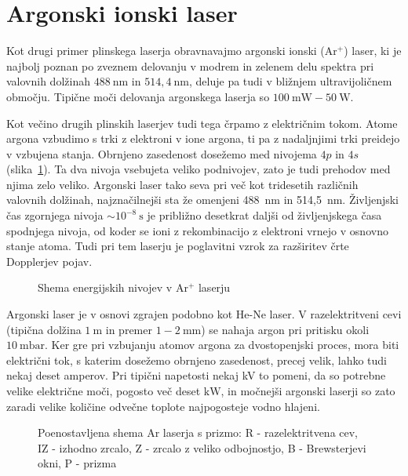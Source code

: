 \section{Argonski ionski laser}
Kot drugi primer plinskega laserja obravnavajmo argonski ionski (Ar$^+$) laser,
ki je najbolj poznan po zveznem delovanju v modrem in zelenem delu spektra pri 
valovnih dolžinah $488~\si{\nano\metre}$ in $514,4~\si{\nano\metre}$, deluje 
pa tudi v bližnjem ultravijoličnem območju. Tipične moči delovanja argonskega laserja
so $100~\si{\milli\watt} - 50~\si{\watt}$.

Kot večino drugih plinskih laserjev tudi tega črpamo z električnim tokom.
Atome argona vzbudimo s trki z elektroni v ione argona, ti pa z nadaljnjimi
trki preidejo v vzbujena stanja. Obrnjeno zasedenost
dosežemo med nivojema $4p$ in $4s$ (slika~\ref{fig:ArE}). 
Ta dva nivoja vsebujeta veliko podnivojev, zato je tudi prehodov med
njima zelo veliko. Argonski laser tako seva pri več kot tridesetih različnih
valovnih dolžinah, najznačilnejši sta že omenjeni 488~nm in 514,5~nm. 
Življenjski čas zgornjega nivoja $\sim 10^{-8}~\si{\second}$ je približno 
desetkrat daljši od življenjskega časa spodnjega nivoja, od koder se ioni
z rekombinacijo z elektroni vrnejo v osnovno stanje atoma. Tudi pri tem laserju
je poglavitni vzrok za razširitev črte Dopplerjev 
pojav.

\begin{figure}[h]
\centering
\def\svgwidth{80truemm} 

\caption{Shema energijskih nivojev v Ar$^+$ laserju}
\label{fig:ArE}
\end{figure}

Argonski laser je v osnovi zgrajen podobno kot He-Ne laser. 
V razelektritveni cevi
(tipična dolžina $1~\si{\metre}$ in premer $1-2~\si{\milli\metre}$)
se nahaja argon pri pritisku okoli $10~\si{\milli\bar}$. Ker gre pri 
vzbujanju atomov argona za dvostopenjski proces, mora biti električni tok, 
s katerim dosežemo obrnjeno zasedenost, precej velik, lahko tudi nekaj deset amperov. 
Pri tipični napetosti nekaj kV to pomeni, da so potrebne velike električne moči, 
pogosto več deset $\si{\kilo\watt}$, in močnejši argonski laserji so zato zaradi 
velike količine odvečne toplote najpogosteje vodno hlajeni.

\begin{figure}[h]
\centering
\def\svgwidth{110truemm} 

\caption{Poenostavljena shema Ar laserja s prizmo: R - razelektritvena cev, 
IZ - izhodno zrcalo, Z - zrcalo z veliko odbojnostjo, B - Brewsterjevi okni, 
P - prizma
}
\label{fig:ArS}
\end{figure}

